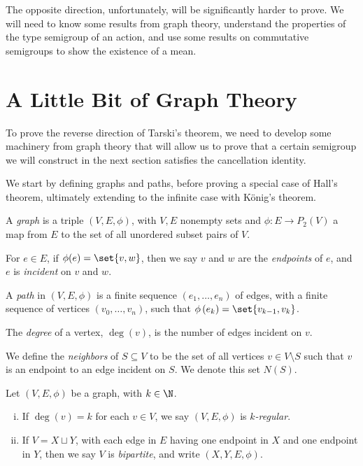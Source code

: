 The opposite direction, unfortunately, will be significantly harder to prove. We will need to know some results from graph theory, understand the properties of the type semigroup of an action, and use some results on commutative semigroups to show the existence of a mean.
\section{A Little Bit of Graph Theory}
To prove the reverse direction of Tarski's theorem, we need to develop some machinery from graph theory that will allow us to prove that a certain semigroup we will construct in the next section satisfies the cancellation identity.\newline

We start by defining graphs and paths, before proving a special case of Hall's theorem, ultimately extending to the infinite case with König's theorem.
\begin{definition}
  A \textit{graph} is a triple $\left(V,E,\phi\right)$, with $V,E$ nonempty sets and $\phi\colon E\rightarrow P_{2}(V)$ a map from $E$ to the set of all unordered subset pairs of $V$.\newline

  For $e\in E$, if $\phi(e) = \set{v,w}$, then we say $v$ and $w$ are the \textit{endpoints} of $e$, and $e$ is \textit{incident} on $v$ and $w$.\newline

  A \textit{path} in $\left(V,E,\phi\right)$ is a finite sequence $\left(e_1,\dots,e_n\right)$ of edges, with a finite sequence of vertices $\left(v_0,\dots,v_n\right)$, such that $\phi\left(e_k\right) = \set{v_{k-1},v_k}$.\newline

  The \textit{degree} of a vertex, $\deg(v)$, is the number of edges incident on $v$.\newline

  We define the \textit{neighbors} of $S\subseteq V$ to be the set of all vertices $v\in V\setminus S$ such that $v$ is an endpoint to an edge incident on $S$. We denote this set $N(S)$.
\end{definition}

\begin{definition}
  Let $\left(V,E,\phi\right)$ be a graph, with $k\in \N$.
  \begin{enumerate}[(i)]
    \item If $\deg(v) = k$ for each $v\in V$, we say $\left(V,E,\phi\right)$ is \textit{$k$-regular}.
    \item If $V = X\sqcup Y$, with each edge in $E$ having one endpoint in $X$ and one endpoint in $Y$, then we say $V$ is \textit{bipartite}, and write $\left(X,Y,E,\phi\right)$.
  \end{enumerate}
\end{definition}


